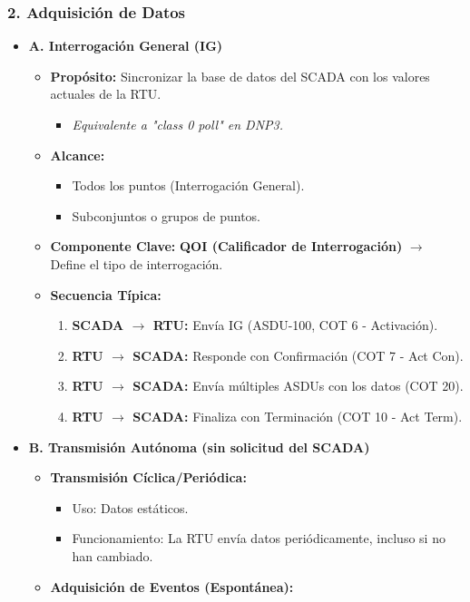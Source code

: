 \documentclass[a5paper]{book}%
\begin{document}
\subsubsection*{2. Adquisición de Datos}
\begin{itemize}
	\item \textbf{A. Interrogación General (IG)}
	\begin{itemize}
		\item \textbf{Propósito:} Sincronizar la base de datos del SCADA con los valores actuales de la RTU.
		\begin{itemize}
			\item \textit{Equivalente a "class 0 poll" en DNP3.}
		\end{itemize}
		\item \textbf{Alcance:}
		\begin{itemize}
			\item Todos los puntos (Interrogación General).
			\item Subconjuntos o grupos de puntos.
		\end{itemize}
		\item \textbf{Componente Clave:} \textbf{QOI (Calificador de Interrogación)} $\rightarrow$ Define el tipo de interrogación.
		\item \textbf{Secuencia Típica:}
		\begin{enumerate}
			\item \textbf{SCADA $\rightarrow$ RTU:} Envía IG (ASDU-100, COT 6 - Activación).
			\item \textbf{RTU $\rightarrow$ SCADA:} Responde con Confirmación (COT 7 - Act Con).
			\item \textbf{RTU $\rightarrow$ SCADA:} Envía múltiples ASDUs con los datos (COT 20).
			\item \textbf{RTU $\rightarrow$ SCADA:} Finaliza con Terminación (COT 10 - Act Term).
		\end{enumerate}
	\end{itemize}
	\item \textbf{B. Transmisión Autónoma (sin solicitud del SCADA)}
	\begin{itemize}
		\item \textbf{Transmisión Cíclica/Periódica:}
		\begin{itemize}
			\item Uso: Datos estáticos.
			\item Funcionamiento: La RTU envía datos periódicamente, incluso si no han cambiado.
		\end{itemize}
		\item \textbf{Adquisición de Eventos (Espontánea):}

\end{itemize}
\end{itemize}
\end{document}
